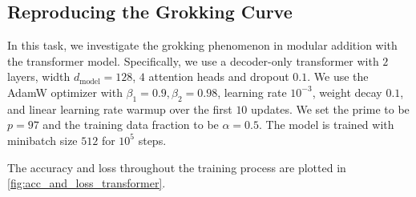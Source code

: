 \subsection{Reproducing the Grokking Curve}
\label{sec:subtask1}

In this task, we investigate the grokking phenomenon in modular addition with the transformer model.
Specifically, we use a decoder-only transformer with $2$ layers, width $d_{\mathrm{model}} = 128$, $4$ attention heads and dropout $0.1$.
We use the AdamW optimizer with $\beta_1 = 0.9, \beta_2 = 0.98$, learning rate $10^{-3}$, weight decay $0.1$, and linear learning rate warmup over the first $10$ updates.
We set the prime to be $p = 97$ and the training data fraction to be $\alpha = 0.5$.
The model is trained with minibatch size $512$ for $10^5$ steps.

The accuracy and loss throughout the training process are plotted in \cref{fig:acc_and_loss_transformer}.

